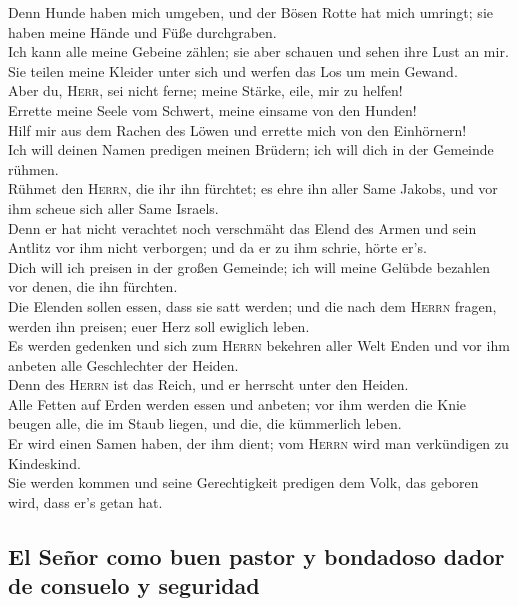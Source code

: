  Denn Hunde haben mich umgeben, und der Bösen Rotte hat
mich umringt; sie haben meine Hände und Füße durchgraben.\\
 Ich kann alle meine Gebeine zählen; sie aber schauen und
sehen ihre Lust an mir.\\
 Sie teilen meine Kleider unter sich und werfen das Los
um mein Gewand.\\
 Aber du, \textsc{Herr}, sei nicht ferne; meine Stärke,
eile, mir zu helfen!\\
 Errette meine Seele vom Schwert, meine einsame von den
Hunden!\\
 Hilf mir aus dem Rachen des Löwen und errette mich von
den Einhörnern!\\
 Ich will deinen Namen predigen meinen Brüdern; ich will
dich in der Gemeinde rühmen.\\
 Rühmet den \textsc{Herrn}, die ihr ihn fürchtet; es ehre
ihn aller Same Jakobs, und vor ihm scheue sich aller Same Israels.\\
 Denn er hat nicht verachtet noch verschmäht das Elend
des Armen und sein Antlitz vor ihm nicht verborgen; und da er zu ihm
schrie, hörte er's.\\
 Dich will ich preisen in der großen Gemeinde; ich will
meine Gelübde bezahlen vor denen, die ihn fürchten.\\
 Die Elenden sollen essen, dass sie satt werden; und die
nach dem \textsc{Herrn} fragen, werden ihn preisen; euer Herz soll
ewiglich leben.\\
 Es werden gedenken und sich zum \textsc{Herrn} bekehren
aller Welt Enden und vor ihm anbeten alle Geschlechter der Heiden.\\
 Denn des \textsc{Herrn} ist das Reich, und er herrscht
unter den Heiden.\\
 Alle Fetten auf Erden werden essen und anbeten; vor ihm
werden die Knie beugen alle, die im Staub liegen, und die, die
kümmerlich leben.\\
 Er wird einen Samen haben, der ihm dient; vom
\textsc{Herrn} wird man verkündigen zu Kindeskind.\\
 Sie werden kommen und seine Gerechtigkeit predigen dem
Volk, das geboren wird, dass er's getan hat.

\hypertarget{el-seuxf1or-como-buen-pastor-y-bondadoso-dador-de-consuelo-y-seguridad}{%
\subsection{El Señor como buen pastor y bondadoso dador de consuelo y
seguridad}\label{el-seuxf1or-como-buen-pastor-y-bondadoso-dador-de-consuelo-y-seguridad}}

